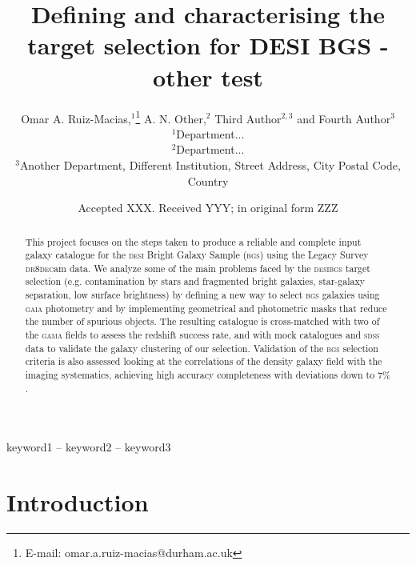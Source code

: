 \documentclass[fleqn,usenatbib]{mnras}
\title[Short title, max. 45 characters]{Defining and characterising the target selection for DESI BGS - other test}
\author[Omar A. Ruiz-Macias et al.]{
Omar A. Ruiz-Macias,$^{1}$\thanks{E-mail: omar.a.ruiz-macias@durham.ac.uk}
A. N. Other,$^{2}$
Third Author$^{2,3}$
and Fourth Author$^{3}$
\\
$^{1}$Department...\\
$^{2}$Department...\\
$^{3}$Another Department, Different Institution, Street Address, City Postal Code, Country
}
\date{Accepted XXX. Received YYY; in original form ZZZ}
\newcommand{\BGS}{\textsc{bgs}\xspace}
\newcommand{\DECam}{\textsc{dec}am\xspace}
\newcommand{\DESI}{\textsc{desi}\xspace}
\newcommand{\DReight}{\textsc{dr8}\xspace}
\newcommand{\GAMA}{\textsc{gama}\xspace}
\newcommand{\GAIA}{\textsc{gaia}\xspace}
\newcommand{\SDSS}{\textsc{sdss}\xspace}
\begin{document}
\label{firstpage}
\pagerange{\pageref{firstpage}--\pageref{lastpage}}
\maketitle

\begin{abstract}
This project focuses on the steps taken to produce a reliable and complete input galaxy catalogue for the \DESI Bright Galaxy Sample (\BGS) using the Legacy Survey \DReight \DECam data. We analyze some of the main problems faced by the \DESI \BGS target selection (e.g. contamination by stars and fragmented bright galaxies, star-galaxy separation, low surface brightness) by defining a new way to select \BGS galaxies using \GAIA photometry and by implementing geometrical and photometric masks that reduce the number of spurious objects. The resulting catalogue is cross-matched with two of the \GAMA fields to assess the redshift success rate, and with mock catalogues and \SDSS data to validate the galaxy clustering of our selection. Validation of the \BGS selection criteria is also assessed looking at the correlations of the density galaxy field with the imaging systematics, achieving high accuracy completeness with deviations down to $7\%$.
\end{abstract}

\begin{keywords}
keyword1 -- keyword2 -- keyword3
\end{keywords}



\section{Introduction}\label{sec:intro} %
\end{document}
